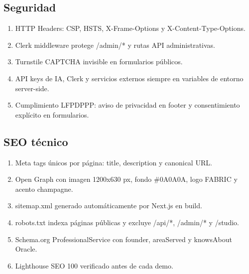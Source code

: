 \documentclass[11pt,letterpaper]{article}
\begin{document}
\subsection{Seguridad}

\begin{enumerate}
\item HTTP Headers: CSP, HSTS, X-Frame-Options y X-Content-Type-Options.
\item Clerk middleware protege /admin/* y rutas API administrativas.
\item Turnstile CAPTCHA invisible en formularios públicos.
\item API keys de IA, Clerk y servicios externos siempre en variables de entorno server-side.
\item Cumplimiento LFPDPPP: aviso de privacidad en footer y consentimiento explícito en formularios.
\end{enumerate}

\subsection{SEO técnico}

\begin{enumerate}
\item Meta tags únicos por página: title, description y canonical URL.
\item Open Graph con imagen 1200x630 px, fondo \#0A0A0A, logo FABRIC y acento champagne.
\item sitemap.xml generado automáticamente por Next.js en build.
\item robots.txt indexa páginas públicas y excluye /api/*, /admin/* y /studio.
\item Schema.org ProfessionalService con founder, areaServed y knowsAbout Oracle.
\item Lighthouse SEO 100 verificado antes de cada demo.
\end{enumerate}
\end{document}
